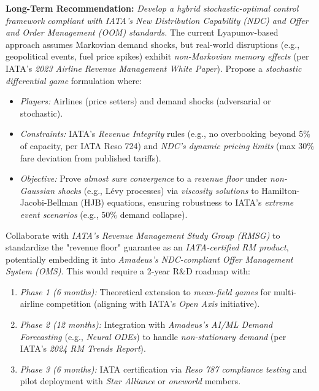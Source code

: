 \documentclass[11pt,a4paper]{article}
\begin{document}
\textbf{Long-Term Recommendation:} \textit{Develop a hybrid stochastic-optimal control framework compliant with IATA's \textit{New Distribution Capability (NDC)} and \textit{Offer and Order Management (OOM)} standards.} The current Lyapunov-based approach assumes Markovian demand shocks, but real-world disruptions (e.g., geopolitical events, fuel price spikes) exhibit \textit{non-Markovian memory effects} (per IATA's \textit{2023 Airline Revenue Management White Paper}). Propose a \textit{stochastic differential game} formulation where:
\begin{itemize}
    \item \textit{Players:} Airlines (price setters) and demand shocks (adversarial or stochastic).
    \item \textit{Constraints:} IATA's \textit{Revenue Integrity} rules (e.g., no overbooking beyond 5\% of capacity, per IATA Reso 724) and \textit{NDC's dynamic pricing limits} (max 30\% fare deviation from published tariffs).
    \item \textit{Objective:} Prove \textit{almost sure convergence} to a \textit{revenue floor} under \textit{non-Gaussian shocks} (e.g., Lévy processes) via \textit{viscosity solutions} to Hamilton-Jacobi-Bellman (HJB) equations, ensuring robustness to IATA's \textit{extreme event scenarios} (e.g., 50\% demand collapse).
\end{itemize}
Collaborate with \textit{IATA's Revenue Management Study Group (RMSG)} to standardize the "revenue floor" guarantee as an \textit{IATA-certified RM product}, potentially embedding it into \textit{Amadeus's NDC-compliant Offer Management System (OMS)}. This would require a 2-year R\&D roadmap with:
\begin{enumerate}
    \item \textit{Phase 1 (6 months):} Theoretical extension to \textit{mean-field games} for multi-airline competition (aligning with IATA's \textit{Open Axis} initiative).
    \item \textit{Phase 2 (12 months):} Integration with \textit{Amadeus's AI/ML Demand Forecasting} (e.g., \textit{Neural ODEs}) to handle \textit{non-stationary demand} (per IATA's \textit{2024 RM Trends Report}).
    \item \textit{Phase 3 (6 months):} IATA certification via \textit{Reso 787 compliance testing} and pilot deployment with \textit{Star Alliance} or \textit{oneworld} members.
\end{enumerate}
\end{document}
